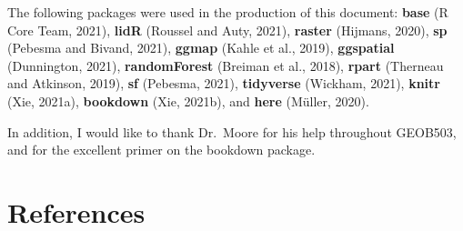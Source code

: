 \documentclass[
]{article}
\begin{document}
The following packages were used in the production of this document: \textbf{base} (R Core Team, 2021), \textbf{lidR} (Roussel and Auty, 2021), \textbf{raster} (Hijmans, 2020), \textbf{sp} (Pebesma and Bivand, 2021), \textbf{ggmap} (Kahle et al., 2019), \textbf{ggspatial} (Dunnington, 2021), \textbf{randomForest} (Breiman et al., 2018), \textbf{rpart} (Therneau and Atkinson, 2019), \textbf{sf} (Pebesma, 2021), \textbf{tidyverse} (Wickham, 2021), \textbf{knitr} (Xie, 2021a), \textbf{bookdown} (Xie, 2021b), and \textbf{here} (Müller, 2020).

In addition, I would like to thank Dr.~Moore for his help throughout GEOB503, and for the excellent primer on the bookdown package.

\newpage

\hypertarget{references}{%
\section*{References}\label{references}}
\end{document}

